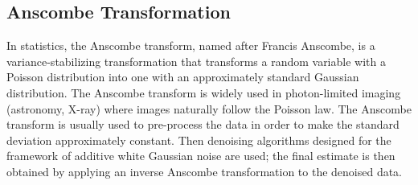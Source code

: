 \subsection*{Anscombe Transformation}
In statistics, the Anscombe transform, named after Francis Anscombe, is a variance-stabilizing transformation that transforms a random variable with a Poisson distribution into one with an approximately standard Gaussian distribution. The Anscombe transform is widely used in photon-limited imaging (astronomy, X-ray) where images naturally follow the Poisson law. The Anscombe transform is usually used to pre-process the data in order to make the standard deviation approximately constant. Then denoising algorithms designed for the framework of additive white Gaussian noise are used; the final 
estimate is then obtained by applying an inverse Anscombe transformation to the denoised data.
